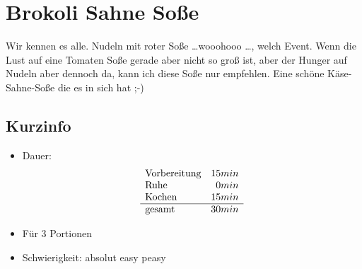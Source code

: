 \section{Brokoli Sahne Soße}
  \label{Haupt:Brokoli_Sahne_Sosse}
    Wir kennen es alle. Nudeln mit roter Soße \dots wooohooo \dots, welch Event.
    Wenn die Lust auf eine Tomaten Soße gerade aber nicht so groß ist, aber der
    Hunger auf Nudeln aber dennoch da, kann ich diese Soße nur empfehlen. Eine
    schöne Käse-Sahne-Soße die es in sich hat ;-)

    \subsection*{Kurzinfo}
      \begin{itemize}
        \item Dauer:
          \begin{displaymath}
            \begin{array}{l r}
              \text{Vorbereitung} & 15min\\
              \text{Ruhe} & 0min\\
              \text{Kochen} & 15min\\ \hline
              \text{gesamt} & 30min
            \end{array}
          \end{displaymath}
        \item Für 3 Portionen
        \item Schwierigkeit: absolut easy peasy
      \end{itemize}

